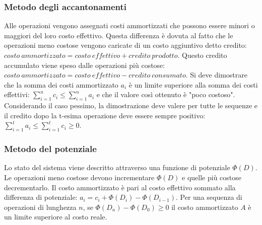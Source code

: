 \subsubsection{Metodo degli accantonamenti}
Alle operazioni vengono assegnati costi ammortizzati che possono essere minori o maggiori del loro costo effettivo. Questa differenza \`e dovuta al fatto
che le operazioni meno costose vengono caricate di un costo aggiuntivo detto credito: $costo\ ammortizzato=costo\ effettivo+credito\ prodotto$. Questo 
credito accumulato viene speso dalle operazioni pi\`u costose: $costo\ ammortizzato=costo\ effettivo-credito\ consumato$. Si deve dimostrare che la somma
dei costi ammortizzato $a_i$ \`e un limite superiore alla somma dei costi effettivi: $\sum\limits_{i=1}^nc_i\le\sum\limits_{i=1}^na_i$ e che il valore 
cos\`i ottenuto \`e "poco costoso". Considerando il caso pessimo, la dimostrazione deve valere per tutte le sequenze e il credito dopo la t-esima operazione
deve essere sempre positivo: $\sum\limits_{i=1}^ta_i\le\sum\limits_{i=1}^tc_i\ge 0$.
\subsubsection{Metodo del potenziale}
Lo stato del sistema viene descritto attraverso una funzione di potenziale $\Phi(D)$. Le operazioni meno costose devono incrementare $\Phi(D)$ e quelle
pi\`u costose decrementarlo. Il costo ammortizzato \`e pari al costo effettivo sommato alla differenza di potenziale: $a_i=c_i+\Phi(D_i)-\Phi(D_{i-1})$.
Per una sequenza di operazioni di lunghezza $n$, se $\Phi(D_n)-\Phi(D_0)\ge 0$ il costo ammortizzato $A$ \`e un limite superiore al costo reale.

